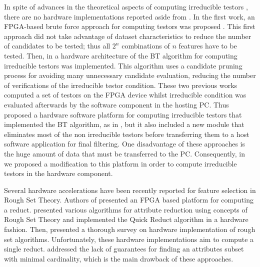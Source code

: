 \documentclass[authoryear,preprint,review,12pt]{elsarticle}
\begin{document}
In spite of advances in the theoretical aspects of computing
irreducible testors \citep{R5,R8,R9}, there are 
no hardware implementations reported aside from \citep{R10,R11,R21}.
In the first work, an FPGA-based brute force approach for computing testors was proposed
\citep{R10}. This first approach did not take advantage of dataset characteristics to reduce the number 
of candidates to be tested; thus all $2^n$ combinations of $n$ features have to be tested. 
Then, in \citep{R11} a hardware architecture of the BT algorithm for computing irreducible testors was implemented. 
This algorithm uses a candidate pruning process for avoiding many unnecessary candidate evaluation, 
reducing the number of verifications of the irreducible testor condition. 
These two previous works computed a set of testors on the FPGA device whilst irreducible condition 
was evaluated afterwards by the software component in the hosting PC. 
Thus \cite{R21} proposed a hardware software platform for computing irreducible testors that 
implemented the BT algorithm, as in \citep{R11}, but it also included a new module that eliminates most of 
the non irreducible testors before transferring them to a host software application for final filtering. 
One disadvantage of these approaches is the huge amount of data that must be transferred to the PC.  
Consequently, in~\citep{Rod14} we proposed a modification to this platform in order to compute irreducible 
testors in the hardware component. 

Several hardware accelerations have been recently reported for feature selection in Rough Set Theory. Authors of
\citep{Grze13,Kop14} presented an FPGA based platform for computing a reduct. \cite{Tiwari13} presented various
algorithms for attribute reduction using concepts of Rough Set Theory and implemented the Quick Reduct
algorithm in a hardware fashion. Then, \cite{Tiwari14} presented a thorough survey on hardware implementation 
of rough set algorithms. Unfortunately, these hardware implementations aim to compute a single reduct. 
\cite{Jensen14} addressed the lack of guarantees for finding an attributes subset with minimal cardinality, 
which is the main drawback of these approaches. 
\end{document}

